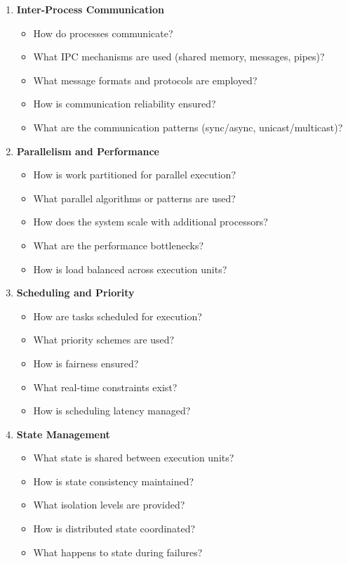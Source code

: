 \documentclass[11pt,letterpaper]{article}
\begin{document}
\begin{enumerate}[label=\textbf{C\arabic*:}, leftmargin=2.5em]
    \item \textbf{Inter-Process Communication}
    \begin{itemize}[nosep]
        \item How do processes communicate?
        \item What IPC mechanisms are used (shared memory, messages, pipes)?
        \item What message formats and protocols are employed?
        \item How is communication reliability ensured?
        \item What are the communication patterns (sync/async, unicast/multicast)?
    \end{itemize}
    
    \item \textbf{Parallelism and Performance}
    \begin{itemize}[nosep]
        \item How is work partitioned for parallel execution?
        \item What parallel algorithms or patterns are used?
        \item How does the system scale with additional processors?
        \item What are the performance bottlenecks?
        \item How is load balanced across execution units?
    \end{itemize}
    
    \item \textbf{Scheduling and Priority}
    \begin{itemize}[nosep]
        \item How are tasks scheduled for execution?
        \item What priority schemes are used?
        \item How is fairness ensured?
        \item What real-time constraints exist?
        \item How is scheduling latency managed?
    \end{itemize}
    
    \item \textbf{State Management}
    \begin{itemize}[nosep]
        \item What state is shared between execution units?
        \item How is state consistency maintained?
        \item What isolation levels are provided?
        \item How is distributed state coordinated?
        \item What happens to state during failures?
    \end{itemize}
    

\end{enumerate}
\end{document}
